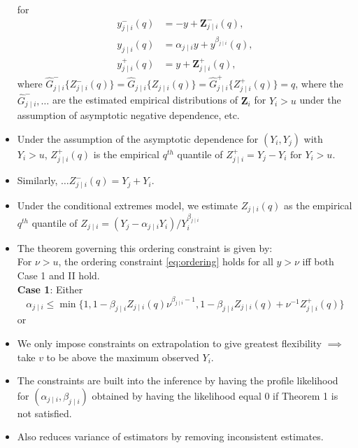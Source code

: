 \documentclass{article}
\numberwithin{equation}{section}
\begin{document}
\begin{itemize}
\begin{equation}
    \end{equation}
    for
    \begin{align*}
      y^-_{j \mid i}(q) &= -y + \bm{Z}_{j \mid i}^-(q), \\
      y_{j \mid i}(q) &= \alpha_{j \mid i}y + y^{\beta_{j \mid i}}(q), \\
      y^+_{j \mid i}(q) &= y + \bm{Z}_{j \mid i}^+(q),
    \end{align*}
    where
    $\hat{G}^-_{j\mid i}\{Z^-_{j \mid i}(q)\} = 
    \hat{G}_{j\mid i}\{Z_{j \mid i}(q)\} = 
  \hat{G}^+_{j\mid i}\{Z^+_{j \mid i}(q)\} = q$, where the $\hat{G}^-_{j \mid i}, \ldots$ are the estimated empirical distributions of $\bm{Z}_i$ for $Y_i > u$ under the assumption of asymptotic negative dependence, etc.
  \item Under the assumption of the asymptotic dependence for $(Y_i, Y_j)$ with $Y_i > u$, $Z^+_{j \mid i}(q)$ is the empirical $q^{th}$ quantile of $Z^+_{j \mid i} = Y_j - Y_i \text{ for } Y_i > u$. \\
  \item Similarly, $\ldots Z^-_{j \mid i}(q) = Y_j + Y_i$. \\
  \item Under the conditional extremes model, we estimate $Z_{j \mid i}(q)$ as the empirical $q^{th}$ quantile of $Z_{j \mid i} = (Y_j - \alpha_{j \mid i}Y_i) / Y_i^{\beta_{j \mid i}}$
  \item The theorem governing this ordering constraint is given by: \\
    For $\nu > u$, the ordering constraint \ref{eq:ordering} holds for all $y > \nu$ iff both Case 1 and II hold. \\
    \textbf{Case 1}: Either 
    \[
      \alpha_{j \mid i} \le \min\{
      1, 
      1 - \beta_{j \mid i}Z_{j \mid i}(q)\nu^{\beta_{j \mid i} - 1}, 
      1 - \beta_{j \mid i}Z_{j \mid i}(q) + \nu^{-1}Z^+_{j \mid i}(q)
      \}
    \]
    or 
  \item We only impose constraints on extrapolation to give greatest flexibility $\implies$ take $v$ to be above the maximum observed $Y_i$. 
  \item The constraints are built into the inference by having the profile likelihood for $(\alpha_{j \mid i}, \beta_{j \mid i})$ obtained by having the likelihood equal 0 if Theorem 1 is not satisfied.
  \item Also reduces variance of estimators by removing inconsistent estimates. 
\end{itemize}
\end{document}
